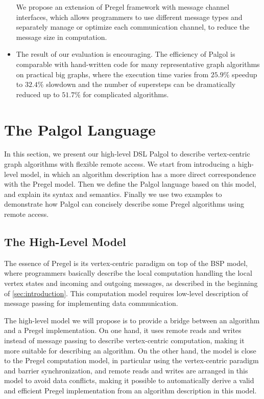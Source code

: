 \documentclass{sokendai_thesis} %
\begin{document}
\begin{itemize}
 We propose an extension of Pregel framework with message channel interfaces, which allows programmers to use different message types and separately manage or optimize each communication channel, to reduce the message size in computation.
\item
 The result of our evaluation is encouraging.
 The efficiency of Palgol is comparable with hand-written code for many representative graph algorithms on practical big graphs, where the execution time varies from $25.9\%$ speedup to $32.4\%$ slowdown and the number of supersteps can be dramatically reduced up to $51.7\%$ for complicated algorithms.
\end{itemize}

\chapter{The Palgol Language}

In this section, we present our high-level DSL Palgol to describe vertex-centric graph algorithms with flexible remote access.
We start from introducing a high-level model, in which an algorithm description has a more direct correspondence with the Pregel model.
Then we define the Palgol language based on this model, and explain its syntax and semantics.
Finally we use two examples to demonstrate how Palgol can concisely describe some Pregel algorithms using remote access.

\section{The High-Level Model}

The essence of Pregel is its vertex-centric paradigm on top of the BSP model, where programmers basically describe the local computation handling the local vertex states and incoming and outgoing messages, as described in the beginning of \autoref{sec:introduction}.
This computation model requires low-level description of message passing for implementing data communication.

The high-level model we will propose is to provide a bridge between an algorithm and a Pregel implementation.
On one hand, it uses remote reads and writes instead of message passing to describe vertex-centric computation, making it more suitable for describing an algorithm.
On the other hand, the model is close to the Pregel computation model, in particular using the vertex-centric paradigm and barrier synchronization, and remote reads and writes are arranged in this model to avoid data conflicts, making it possible to automatically derive a valid and efficient Pregel implementation from an algorithm description in this model.
\end{document}
